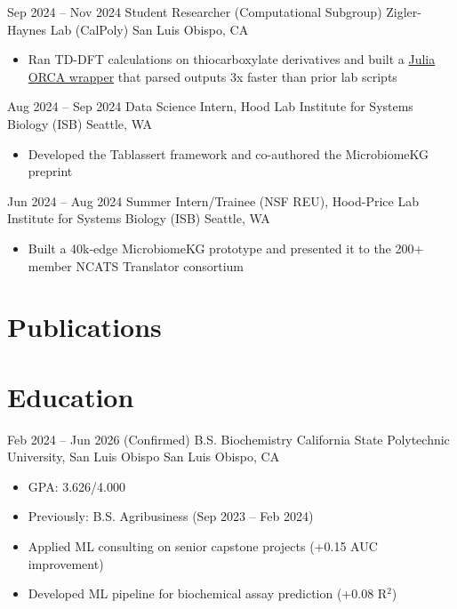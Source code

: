 \documentclass[11pt]{moderncv}
\newcommand{\skyespace}{\vspace{8pt}}
\newcommand{\colorhref}[2]{\href{#1}{\textcolor{linkblue}{#2}}}
\begin{document}
\skyespace
\cventry
{Sep 2024 -- Nov 2024}
{Student Researcher (Computational Subgroup)}
{Zigler-Haynes Lab (CalPoly)}
{San Luis Obispo, CA}
{}
{%
	\begin{itemize}
		\item Ran TD-DFT calculations on thiocarboxylate derivatives and built a \colorhref{https://github.com/SkyeAv/OrcaFunctionalHub}{Julia ORCA wrapper} that parsed outputs 3x faster than prior lab scripts
	\end{itemize}
}

\skyespace
\cventry
{Aug 2024 -- Sep 2024}
{Data Science Intern, Hood Lab}
{Institute for Systems Biology (ISB)}
{Seattle, WA}
{}
{%
	\begin{itemize}
		\item Developed the Tablassert framework and co-authored the MicrobiomeKG preprint
	\end{itemize}
}

\skyespace
\cventry
{Jun 2024 -- Aug 2024}
{Summer Intern/Trainee (NSF REU), Hood-Price Lab}
{Institute for Systems Biology (ISB)}
{Seattle, WA}
{}
{%
	\begin{itemize}
		\item Built a 40k-edge MicrobiomeKG prototype and presented it to the 200+ member NCATS Translator consortium
	\end{itemize}
}
\section{Publications}
\makeatletter
\renewenvironment{thebibliography}[1]
{%
	\list{\@biblabel{\@arabic\c@enumiv}}{%
		\settowidth\labelwidth{\@biblabel{\@arabic\c@enumiv}}%
		\leftmargin\labelwidth
		\advance\leftmargin\labelsep
		\usecounter{enumiv}%
		\let\p@enumiv\@empty
		\renewcommand\theenumiv{\@arabic\c@enumiv}%
	}%
	\sloppy\clubpenalty4000\widowpenalty4000
	\sfcode`\.=\@m
}
{%
	\def\@noitemerr{\@latex@warning{Empty `thebibliography' environment}}%
	\endlist
}
\makeatother
\nocite{goetz2025mbkg, translator2025, qin2024multiomics}


\section{Education}
\cventry
{Feb 2024 -- Jun 2026 (Confirmed)}
{B.S. Biochemistry}
{California State Polytechnic University, San Luis Obispo}
{San Luis Obispo, CA}
{}
{%
	\begin{itemize}[noitemsep, topsep=5pt, font=\normalsize]
		\item GPA: 3.626/4.000
		\item Previously: B.S. Agribusiness (Sep 2023 -- Feb 2024)
		\item Applied ML consulting on senior capstone projects (+0.15 AUC improvement)
		\item Developed ML pipeline for biochemical assay prediction (+0.08 R$^2$)
	\end{itemize}
}
\end{document}
